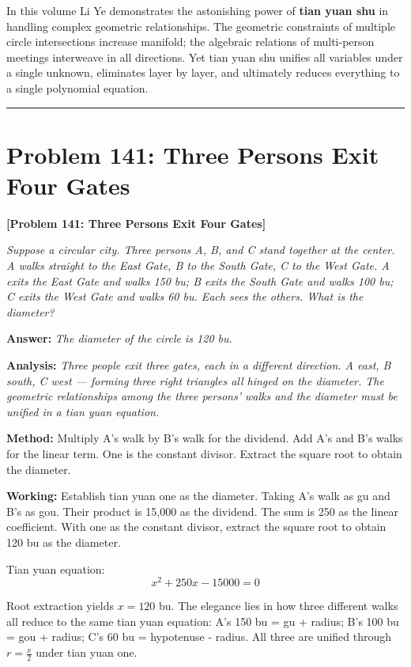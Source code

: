 \documentclass[11pt,a4paper]{book}
\newcommand{\answer}[1]{\noindent\textbf{\color{anacolor}Answer: }\textit{#1}\par}
\newcommand{\method}[1]{\noindent\textbf{\color{methodcolor}Method: }#1\par}
\newcommand{\working}[1]{\noindent\textbf{\color{workcolor}Working: }#1\par}
\newcommand{\analysis}[1]{\noindent\textbf{\color{anacolor}Analysis: }\textit{#1}\par}
\newcommand{\longline}{\noindent\rule{\textwidth}{0.4pt}}
\begin{document}
In this volume Li Ye demonstrates the astonishing power of \textbf{tian yuan shu} in handling complex geometric relationships. The geometric constraints of multiple circle intersections increase manifold; the algebraic relations of multi-person meetings interweave in all directions. Yet tian yuan shu unifies all variables under a single unknown, eliminates layer by layer, and ultimately reduces everything to a single polynomial equation.

\longline

\section{Problem 141: Three Persons Exit Four Gates}
\label{sec:prob141}

\noindent\textbf{\color{probcolor}[Problem 141: Three Persons Exit Four Gates]}

\textit{Suppose a circular city. Three persons A, B, and C stand together at the center. A walks straight to the East Gate, B to the South Gate, C to the West Gate. A exits the East Gate and walks 150 bu; B exits the South Gate and walks 100 bu; C exits the West Gate and walks 60 bu. Each sees the others. What is the diameter?}

\answer{The diameter of the circle is 120 bu.}

\analysis{Three people exit three gates, each in a different direction. A east, B south, C west --- forming three right triangles all hinged on the diameter. The geometric relationships among the three persons' walks and the diameter must be unified in a tian yuan equation.}

\method{Multiply A's walk by B's walk for the dividend. Add A's and B's walks for the linear term. One is the constant divisor. Extract the square root to obtain the diameter.}

\working{Establish tian yuan one as the diameter. Taking A's walk as gu and B's as gou. Their product is 15,000 as the dividend. The sum is 250 as the linear coefficient. With one as the constant divisor, extract the square root to obtain 120 bu as the diameter.

Tian yuan equation:
$$x^2 + 250x - 15000 = 0$$

Root extraction yields $x = 120$ bu. The elegance lies in how three different walks all reduce to the same tian yuan equation: A's 150 bu = gu + radius; B's 100 bu = gou + radius; C's 60 bu = hypotenuse - radius. All three are unified through $r = \frac{x}{2}$ under tian yuan one.}
\end{document}
